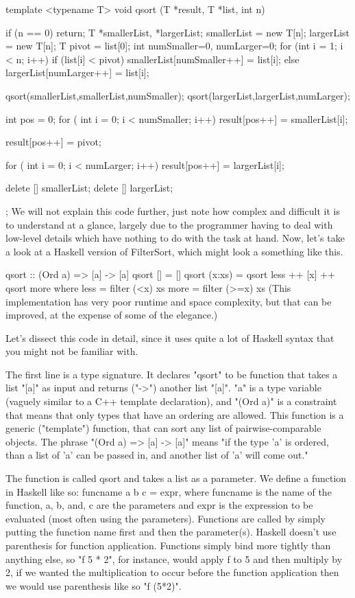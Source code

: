 \documentclass{report}
\begin{document}
template <typename T>
void qsort (T *result, T *list, int n)
{
    if (n == 0) return;
    T *smallerList, *largerList;
    smallerList = new T[n];
    largerList = new T[n];      
    T pivot = list[0];
    int numSmaller=0, numLarger=0;      
    for (int i = 1; i < n; i++)
        if (list[i] < pivot)
            smallerList[numSmaller++] = list[i];
        else 
            largerList[numLarger++] = list[i];
    
    qsort(smallerList,smallerList,numSmaller); 
    qsort(largerList,largerList,numLarger);
    
    int pos = 0;        
    for ( int i = 0; i < numSmaller; i++)
        result[pos++] = smallerList[i];
    
    result[pos++] = pivot;
    
    for ( int i = 0; i < numLarger; i++)
        result[pos++] = largerList[i];
    
    delete [] smallerList;
    delete [] largerList;
};
We will not explain this code further, just note how complex and difficult it is to understand at a glance, largely due to the programmer having to deal with low-level details which have nothing to do with the task at hand. Now, let's take a look at a Haskell version of FilterSort, which might look a something like this.

qsort :: (Ord a) => [a] -> [a]
 qsort []     = []
 qsort (x:xs) = qsort less ++ [x] ++ qsort more
     where less = filter (<x)  xs
           more = filter (>=x) xs
(This implementation has very poor runtime and space complexity, but that can be improved, at the expense of some of the elegance.)

Let's dissect this code in detail, since it uses quite a lot of Haskell syntax that you might not be familiar with.

The first line is a type signature. It declares "qsort" to be function that takes a list "[a]" as input and returns ("->") another list "[a]". "a" is a type variable (vaguely similar to a C++ template declaration), and "(Ord a)" is a constraint that means that only types that have an ordering are allowed. This function is a generic ("template") function, that can sort any list of pairwise-comparable objects. The phrase "(Ord a) => [a] -> [a]" means "if the type 'a' is ordered, than a list of 'a' can be passed in, and another list of 'a' will come out."

The function is called qsort and takes a list as a parameter. We define a function in Haskell like so: funcname a b c = expr, where funcname is the name of the function, a, b, and, c are the parameters and expr is the expression to be evaluated (most often using the parameters). Functions are called by simply putting the function name first and then the parameter(s). Haskell doesn't use parenthesis for function application. Functions simply bind more tightly than anything else, so "f 5 * 2", for instance, would apply f to 5 and then multiply by 2, if we wanted the multiplication to occur before the function application then we would use parenthesis like so "f (5*2)".
\end{document}
